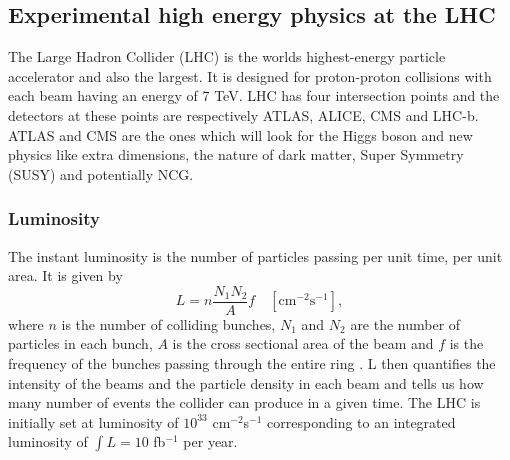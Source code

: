\subsection{Experimental high energy physics at the LHC} \label{sec:lhc}
The Large Hadron Collider (LHC) is the worlds highest-energy particle accelerator and also the largest. It is designed for proton-proton collisions with each beam having an energy of 7 TeV. LHC has four intersection points and the detectors at these points are respectively ATLAS, ALICE, CMS and LHC-b. ATLAS and CMS are the ones which will look for the Higgs boson and new physics like extra dimensions, the nature of dark matter, Super Symmetry (SUSY) and potentially NCG.

\subsubsection{Luminosity}
The instant luminosity is the number of particles passing per unit time, per unit area. It is given by
\begin{equation}
	L=n\frac{N_{1}N_{2}}{A}f \quad [\mbox{cm}^{-2}\mbox{s}^{-1}],
\end{equation}
where $n$ is the number of colliding bunches, $N_{1}$ and $N_{2}$ are the number of particles in each bunch, $A$ is the cross sectional area of the beam and $f$ is the frequency of the bunches passing through the entire ring \cite{martin1998pp}. L then quantifies the intensity of the beams and the particle density in each beam and tells us how many number of events the collider can produce in a given time. The LHC is initially set at luminosity of $10^{33}$ cm$^{-2}$s$^{-1}$ corresponding to an integrated luminosity of $\int L = 10$ fb$^{-1}$ per year.

